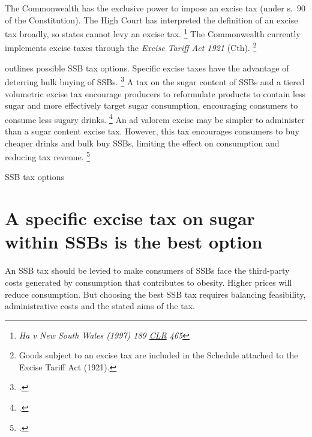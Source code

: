 \documentclass[embargoed]{grattan}
\begin{document}
The Commonwealth has the exclusive power to impose an excise tax (under s.~90 of the Constitution).
The High Court has interpreted the definition of an excise tax broadly, so states cannot levy an excise tax.%
\footnote{\emph{Ha v New South Wales (1997) 189 \href{https://en.wikipedia.org/wiki/Commonwealth_Law_Reports}{CLR} 465 }} The Commonwealth currently implements excise taxes through the \emph{Excise Tariff Act 1921} (Cth).%
\footnote{Goods subject to an excise tax are included in the Schedule attached to the Excise Tariff Act (1921).}

 outlines possible SSB tax options.
Specific excise taxes have the advantage of deterring bulk buying of SSBs.%
\footcites{Sharma2014effectstaxingsugarsweetened}{Freebairn2010Taxationobesity}{Brownell2009publichealtheconomic}{Bonnet2013Taxincidencestrategic}{Wetter2016TaxingSugarSweetened}{Organization2016FiscalPoliciesDiet} A tax on the sugar content of SSBs and a tiered volumetric excise tax encourage producers to reformulate products to contain less sugar and more effectively target sugar consumption, encouraging consumers to consume less sugary drinks.%
\footcites{Smith2016SoftDrinksLevy}{Organization2016FiscalPoliciesDiet} An ad valorem excise may be simpler to administer than a sugar content excise tax.
However, this tax encourages consumers to buy cheaper drinks and bulk buy SSBs, limiting the effect on consumption and reducing tax revenue.%
\footcites{Powell2013Assessingpotentialeffectiveness}{Sharma2014effectstaxingsugarsweetened}{Brownell2009publichealtheconomic}{Organization2016FiscalPoliciesDiet}


\begin{table}
\caption{SSB tax options}\label{tbl:SSB-tax-options}




\end{table}

\section{A specific excise tax on sugar within SSBs is the best option}\label{a-specific-excise-tax-on-sugar-within-ssbs-is-the-best-option}

An SSB tax should be levied to make consumers of SSBs face the third-party costs generated by consumption that contributes to obesity.
Higher prices will reduce consumption.
But choosing the best SSB tax requires balancing feasibility, administrative costs and the stated aims of the tax.
\end{document}

